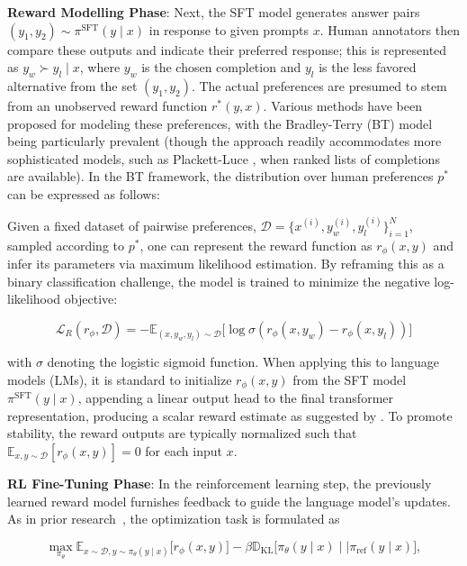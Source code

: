 \textbf{Reward Modelling Phase}: Next, the SFT model generates answer pairs $(y_1, y_2)\sim \pi^\text{SFT}(y \mid x)$ in response to given prompts $x$. Human annotators then compare these outputs and indicate their preferred response; this is represented as $y_w\succ y_l \mid x$, where $y_w$ is the chosen completion and $y_l$ is the less favored alternative from the set $(y_1, y_2)$. The actual preferences are presumed to stem from an unobserved reward function $r^*(y, x)$. Various methods have been proposed for modeling these preferences, with the Bradley-Terry (BT) model \cite{bradley1952rankanalysis} being particularly prevalent (though the approach readily accommodates more sophisticated models, such as Plackett-Luce \citep{plackett1975analysis, luce2012individual}, when ranked lists of completions are available). In the BT framework, the distribution over human preferences $p^*$ can be expressed as follows:

Given a fixed dataset of pairwise preferences, $\mathcal{D}=\bigl\{x^{(i)}, y_w^{(i)}, y_l^{(i)}\bigr\}_{i=1}^N$, sampled according to $p^*$, one can represent the reward function as $r_{\phi}(x, y)$ and infer its parameters via maximum likelihood estimation. By reframing this as a binary classification challenge, the model is trained to minimize the negative log-likelihood objective:

\begin{equation}\label{eq:reward_model}
    \mathcal{L}_R(r_{\phi}, \mathcal{D}) = -\mathbb{E}_{(x, y_w, y_l)\sim \mathcal{D}}\bigl[\log \sigma(r_{\phi}(x, y_w)- r_{\phi}(x, y_l))\bigr]
\end{equation}

with $\sigma$ denoting the logistic sigmoid function. When applying this to language models (LMs), it is standard to initialize $r_{\phi}(x, y)$ from the SFT model $\pi^\text{SFT}(y \mid x)$, appending a linear output head to the final transformer representation, producing a scalar reward estimate as suggested by \cite{ziegler2020finetuning}. To promote stability, the reward outputs are typically normalized such that $\mathbb{E}_{x,y\sim \mathcal{D}}\left[r_\phi(x, y)\right] = 0$ for each input $x$.

\textbf{RL Fine-Tuning Phase}: In the reinforcement learning step, the previously learned reward model furnishes feedback to guide the language model’s updates. As in prior research~\citep{jaques2017sequence, jaques2020human}, the optimization task is formulated as

\begin{equation}\label{eq:RL}
\max_{\pi_{\theta}}  \mathbb{E}_{x\sim \mathcal{D}, y\sim \pi_{\theta}(y \mid x)}\bigl[r_{\phi}(x, y)\bigr] - \beta\mathbb{D}_{\textrm{KL}}\bigl[\pi_{\theta}(y\mid x)\mid \mid \pi_\text{ref}(y\mid x)\bigr],
\end{equation}

